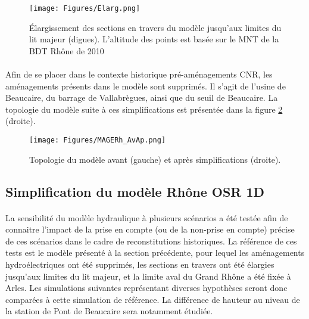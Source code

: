 \documentclass[11pt]{article}
\begin{document}
	\begin{figure}[h]
	\centering
		\texttt{[image: Figures/Elarg.png]}
        \caption{Élargissement des sections en travers du modèle jusqu'aux limites du lit majeur (digues). L'altitude des points est basée sur le MNT de la BDT Rhône de 2010 }
		\label{fig:Elarg}
	\end{figure}		
	
	\paragraph{} Afin de se placer dans le contexte historique pré-aménagements CNR, les aménagements présents dans le modèle sont supprimés. Il s'agit de l'usine de Beaucaire, du barrage de Vallabrègues, ainsi que du seuil de Beaucaire. La topologie du modèle suite à ces simplifications est présentée dans la figure \ref{fig:Mageavap} (droite).
	
	\begin{figure}[h]
	\centering
		\texttt{[image: Figures/MAGERh\_AvAp.png]}
        \caption{Topologie du modèle avant (gauche) et après simplifications (droite).}
		\label{fig:Mageavap}
	\end{figure}		
	
\FloatBarrier	
	\subsection{Simplification du modèle Rhône OSR 1D}
		
	\paragraph{} La sensibilité du modèle hydraulique à plusieurs scénarios a été testée afin de connaitre l'impact de la prise en compte (ou de la non-prise en compte) précise de ces scénarios dans le cadre de reconstitutions historiques. La référence de ces tests est le modèle présenté à la section précédente, pour lequel les aménagements hydroélectriques ont été supprimés, les sections en travers ont été élargies jusqu'aux limites du lit majeur, et la limite aval du Grand Rhône a été fixée à Arles. Les simulations suivantes représentant diverses hypothèses seront donc comparées à cette simulation de référence. La différence de hauteur au niveau de la station de Pont de Beaucaire sera notamment étudiée.
	
\end{document}

